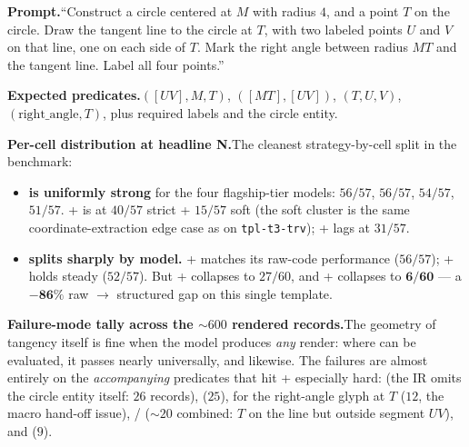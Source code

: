 \noindent\textbf{Prompt.}\quad ``Construct a circle centered at $M$ with radius $4$, and a point $T$ on the circle. Draw the tangent line to the circle at $T$, with two labeled points $U$ and $V$ on that line, one on each side of $T$. Mark the right angle between radius $MT$ and the tangent line. Label all four points.''

\noindent\textbf{Expected predicates.}\quad {}$([UV], M, T)$, $([MT], [UV])$, $(T, U, V)$, $(\text{right\_angle}, T)$, plus required labels and the circle entity.

\noindent\textbf{Per-cell distribution at headline N.}\quad The cleanest strategy-by-cell split in the benchmark:
\begin{itemize}
\item \textbf{\rawcode is uniformly strong} for the four flagship-tier models: \gpt $56/57$, \sonnet $56/57$, \opus $54/57$, \haiku $51/57$. \geminipro + \rawcode is at $40/57$ strict + $15/57$ soft (the soft cluster is the same coordinate-extraction edge case as on \texttt{tpl-t3-trv}); \geminiflash + \rawcode lags at $31/57$.
\item \textbf{\structured splits sharply by model.} \gpt + \structured matches its raw-code performance ($56/57$); \haiku + \structured holds steady ($52/57$). But \sonnet + \structured collapses to $27/60$, and \opus + \structured collapses to $\mathbf{6/60}$ --- a $\mathbf{-86\%}$ raw $\to$ structured gap on this single template.
\end{itemize}

\noindent\textbf{Failure-mode tally across the $\sim 600$ rendered records.}\quad The geometry of tangency itself is fine when the model produces \emph{any} render: where  can be evaluated, it passes nearly universally, and  likewise.
The failures are almost entirely on the \emph{accompanying} predicates that hit \opus + \structured especially hard:  (the IR omits the circle entity itself: $26$ records),  ($25$),  for the right-angle glyph at $T$ ($12$, the macro hand-off issue),  /  ($\sim 20$ combined: $T$ on the line but outside segment $UV$), and  ($9$).

